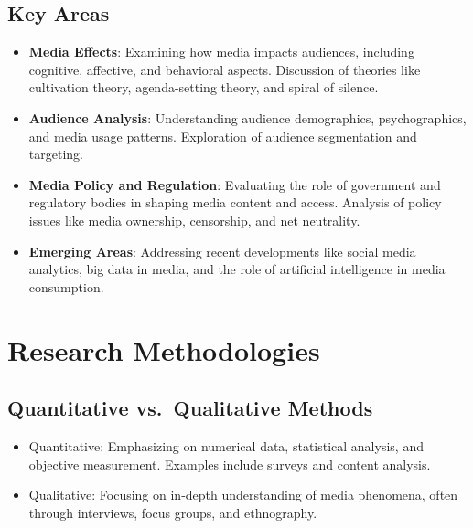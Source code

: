 \documentclass[
]{book}
\begin{document}
\hypertarget{key-areas}{%
\subsection*{Key Areas}\label{key-areas}}

\begin{itemize}
\item
  \textbf{Media Effects}: Examining how media impacts audiences, including cognitive, affective, and behavioral aspects. Discussion of theories like cultivation theory, agenda-setting theory, and spiral of silence.
\item
  \textbf{Audience Analysis}: Understanding audience demographics, psychographics, and media usage patterns. Exploration of audience segmentation and targeting.
\item
  \textbf{Media Policy and Regulation}: Evaluating the role of government and regulatory bodies in shaping media content and access. Analysis of policy issues like media ownership, censorship, and net neutrality.
\item
  \textbf{Emerging Areas}: Addressing recent developments like social media analytics, big data in media, and the role of artificial intelligence in media consumption.
\end{itemize}

\hypertarget{research-methodologies}{%
\section*{Research Methodologies}\label{research-methodologies}}

\hypertarget{quantitative-vs.-qualitative-methods}{%
\subsection*{Quantitative vs.~Qualitative Methods}\label{quantitative-vs.-qualitative-methods}}

\begin{itemize}
\item
  Quantitative: Emphasizing on numerical data, statistical analysis, and objective measurement. Examples include surveys and content analysis.
\item
  Qualitative: Focusing on in-depth understanding of media phenomena, often through interviews, focus groups, and ethnography.
\end{itemize}
\end{document}
